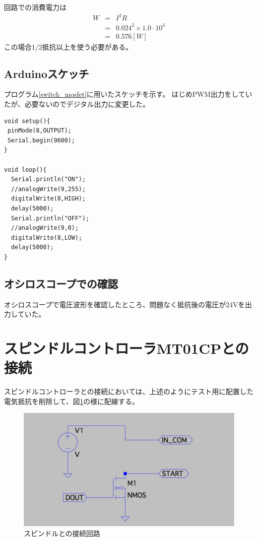 \documentclass[]{jsarticle}
\begin{document}
回路での消費電力は
\begin{eqnarray*}
W & = &  I^{2} R \\
            & = & 0.024^{2} \times 1.0 \cdot 10^{3} \\
            & = & 0.576 [W]
\end{eqnarray*}
この場合1/2抵抗以上を使う必要がある。

\subsection{Arduinoスケッチ}
プログラム\ref{switch_mosfet}に用いたスケッチを示す。
はじめPWM出力をしていたが、必要ないのでデジタル出力に変更した。
\begin{lstlisting}[caption=MOSFET駆動スケッチ,label=switch_mosfet]
void setup(){
 pinMode(8,OUTPUT); 
 Serial.begin(9600);
}

void loop(){
  Serial.println("ON");
  //analogWrite(9,255);
  digitalWrite(8,HIGH);
  delay(5000);
  Serial.println("OFF");
  //analogWrite(9,0);
  digitalWrite(8,LOW);
  delay(5000);  
}
\end{lstlisting}

\subsection{オシロスコープでの確認}
オシロスコープで電圧波形を確認したところ、問題なく抵抗後の電圧が24Vを出力していた。

\section{スピンドルコントローラMT01CPとの接続}
スピンドルコントローラとの接続においては、上述のようにテスト用に配置した電気抵抗を削除して、図\ref{controller}の様に配線する。
\begin{figure}[htbp]
\centering
\includegraphics[width=130mm]{./image/controller.pdf}
\caption{スピンドルとの接続回路}
\label{controller}
\end{figure}
\end{document}
